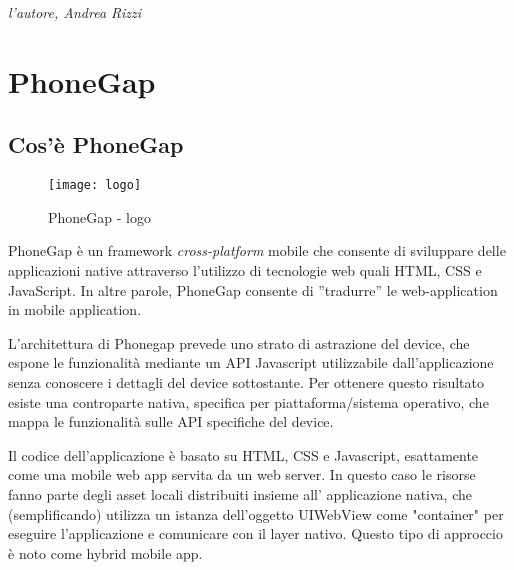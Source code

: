 \documentclass[10pt,a4paper,onecolumn]{article}
\begin{document}
\clearpage


\begin{flushright}
\emph{l'autore, Andrea Rizzi}
\end{flushright}

\clearpage

\section{PhoneGap}

\subsection{Cos'è PhoneGap}

\begin{figure}[h]
	\centering
	\texttt{[image: logo]}
	\caption{PhoneGap - logo}						
	\label{fig:phonegap logo}
\end{figure}

	PhoneGap è un framework \textit{cross-platform} mobile che consente di sviluppare delle applicazioni native attraverso l'utilizzo di tecnologie web quali HTML, CSS e JavaScript. In altre parole, PhoneGap consente di ''tradurre'' le web-application in mobile application.
	
L'architettura di Phonegap prevede uno strato di astrazione del device, che espone le funzionalità mediante un API Javascript utilizzabile dall'applicazione senza conoscere i dettagli del device sottostante. Per ottenere questo risultato esiste una controparte nativa, specifica per piattaforma/sistema operativo, che mappa le funzionalità sulle API specifiche del device.

Il codice dell'applicazione è basato su HTML, CSS e Javascript, esattamente come una mobile web app servita da un web server. In questo caso le risorse fanno parte degli asset locali distribuiti insieme all' applicazione nativa, che (semplificando) utilizza un istanza dell'oggetto UIWebView come "container" per eseguire l'applicazione e comunicare con il layer nativo. Questo tipo di approccio è noto come hybrid mobile app.
\end{document}
